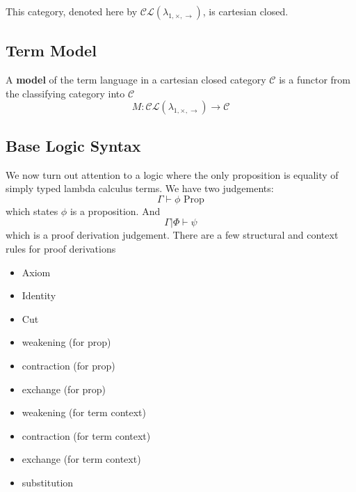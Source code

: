 \documentclass{article}
\begin{document}
This category, denoted here by $\mathcal{CL}(\lambda_{1,\times,\rightarrow})$, is cartesian closed. 
\begin{comment}
    My mistake here is using the definition of classifying category for a theory that does not assume built in products


\begin{align*}
    \textrm{Objects} &:= \textrm{Contexts } \Gamma = (x_1 \colon \alpha_1 , x_2 \colon \alpha_2... )\\ 
    \textrm{Morphisms} &:= \Gamma \rightarrow \Delta \textrm{with } |\Gamma| = n , |\delta| = m \\
    & \textrm{ with } \Gamma = (x_1 : \alpha_1 , x_2 : \alpha_2, .., x_n : \alpha_n) \; \delta = (y_1 : \beta_1 , y_2 : \beta_2, .., y_m : \beta_m)\\
    & \textrm{ consists of an $m$ tuple of equivalence clases of terms} (\beta/\eta \textrm { equivalence}) \\
    & ([M_1], [M_2], .. [M_m]) \textrm{ where } \Gamma \vdash M_i : \beta_i \\
    & \blue{think "multimophisms"}
\end{align*}

\blue{Or, since our calculus has products, we can just take \textbf{Types} as objects. See Crole page 177 and Jacobs page 139}
\end{comment}
\subsection{Term Model}
A \textbf{model} of the term language in a cartesian closed category $\mathcal{C}$ is a functor from the classifying category into $\mathcal{C}$\\
\[
M : \mathcal{CL}(\lambda_{1,\times,\rightarrow}) \rightarrow \mathcal{C}
\]
\subsection{Base Logic Syntax}
We now turn out attention to a logic where the only proposition is equality of simply typed lambda calculus terms.
We have two judgements:
\[
  \Gamma \vdash \phi \textrm{ Prop}  
\]
which states $\phi$ is a proposition. And 
\[
    \Gamma | \Phi \vdash \psi 
\]
which is a proof derivation judgement. There are a few structural and context rules for proof derivations 
\begin{itemize}
    \item Axiom
    \item Identity
    \item Cut 
    \item weakening (for prop)
    \item contraction (for prop)
    \item exchange (for prop)
    \item weakening (for term context)
    \item contraction (for term context)
    \item exchange (for term context)
    \item substitution
\end{itemize}
\end{document}
